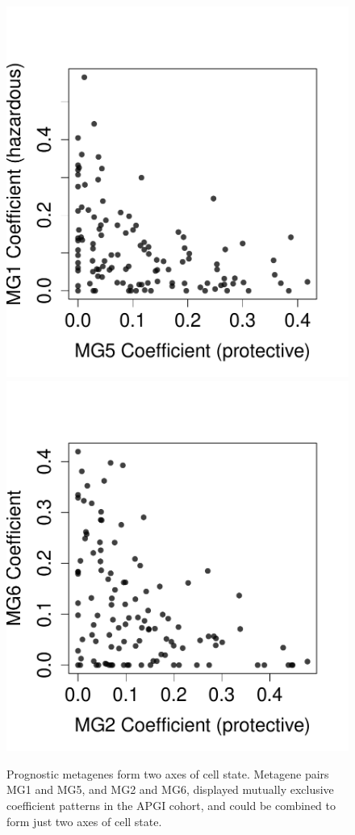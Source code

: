 \documentclass[dissertation.tex]{subfiles}
\begin{document}
\begin{figure}[!htbp]
\centering
\includegraphics[width=.45\linewidth]{analysis/biosurv/reports/18_SIS_diag_dsd_final/figure/metagene-pairs-8}
\includegraphics[width=.45\linewidth]{analysis/biosurv/reports/18_SIS_diag_dsd_final/figure/metagene-pairs-9}
\caption[Prognostic metagenes form two axes of cell state]{Prognostic metagenes form two axes of cell state.  Metagene pairs MG1 and MG5, and MG2 and MG6, displayed mutually exclusive coefficient patterns in the \acrshort{APGI} cohort, and could be combined to form just two axes of cell state.}\label{fig:sigs-coef-mutualexclusion}
\end{figure}
\end{document}
